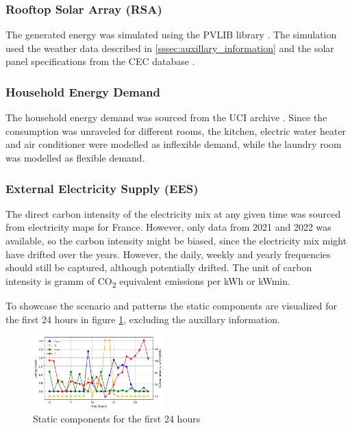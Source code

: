 \subsubsection{Rooftop Solar Array (RSA)}
The generated energy was simulated using the PVLIB library \cite{F.Holmgren.2018}. The simulation used the weather data described in \ref{sssec:auxillary_information} and the solar panel specifications from the CEC database \cite{Dobos.2012}\cite{Boyson.2007}.

\subsubsection{Household Energy Demand}\label{sssec:household_energy_demand}
The household energy demand was sourced from the UCI archive \cite{GeorgesHebrail.2006}. Since the consumption was unraveled for different rooms, the kitchen, electric water heater and air conditioner were modelled as inflexible demand, while the laundry room was modelled as flexible demand.

\subsubsection{External Electricity Supply (EES)}
The direct carbon intensity of the electricity mix at any given time was sourced from electricity maps \cite{.29.12.2023} for France. However, only data from 2021 and 2022 was available, so the carbon intensity might be biased, since the electricity mix might have drifted over the years. However, the daily, weekly and yearly frequencies should still be captured, although potentially drifted. The unit of carbon intensity is gramm of CO\textsubscript{2} equivalent emissions per kWh or kWmin.

To showcase the scenario and patterns the static components are visualized for the first 24 hours in figure \ref{fig:static_components}, excluding the auxillary information.
\begin{figure}[H]
    \centering
    \setlength{\abovecaptionskip}{0pt}
    \includegraphics[width=0.45\textwidth]{figures/static_components.png}
    \caption{Static components for the first 24 hours}
    \label{fig:static_components}
\end{figure}


